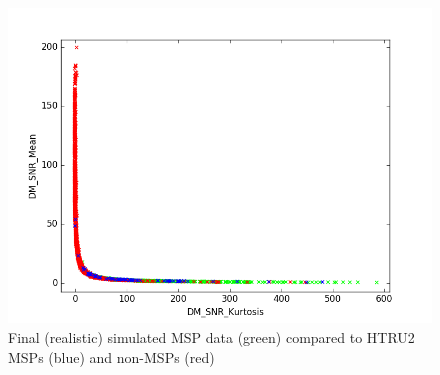 \documentclass[12pt]{article}
\begin{document}
\begin{figure}[h!]
\begin{center}
\includegraphics[scale=0.5]{HTRU2_msp(b)_non_msp(r)_sim_r5(g)_dm_mean_vs_skew.png}
\caption{Final (realistic) simulated MSP data (green) compared to HTRU2 MSPs (blue) and non-MSPs (red)}
\label{HTRU2simr5}
\end{center}
\end{figure}
\end{document}
